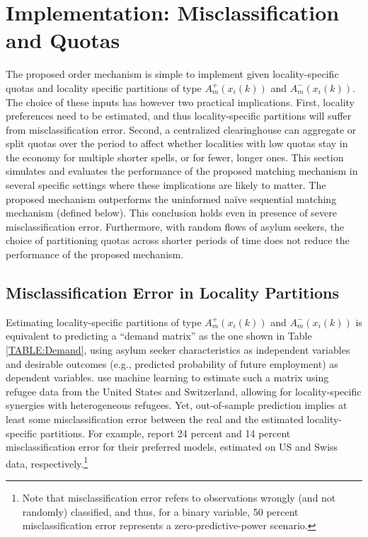 \documentclass[12pt,fleqn]{article}
\begin{document}
\section{Implementation: Misclassification and Quotas}\label{SEC:simulations}
The proposed order mechanism is simple to implement given locality-specific quotas and locality specific partitions of type $A^+_m(x_i(k))$ and $A^-_m(x_i(k))$. The choice of these inputs has however two practical implications. First, locality preferences need to be estimated, and thus locality-specific partitions will suffer from misclassification error. Second, a centralized clearinghouse can aggregate or split quotas over the period to affect whether localities with low quotas stay in the economy for multiple shorter spells, or for fewer, longer ones. This section simulates and evaluates the performance of the proposed matching mechanism in several specific settings where these implications are likely to matter. The proposed mechanism outperforms the uninformed na\"{i}ve sequential matching mechanism (defined below). This conclusion holds even in presence of severe misclassification error. Furthermore, with random flows of asylum seekers, the choice of partitioning quotas across shorter periods of time does not reduce the performance of the proposed mechanism.

\subsection{Misclassification Error in Locality Partitions}
Estimating locality-specific partitions of type $A^+_m(x_i(k))$ and $A^-_m(x_i(k))$ is equivalent to predicting a ``demand matrix'' as the one shown in Table \ref{TABLE:Demand}, using asylum seeker characteristics as independent variables and desirable outcomes (e.g., predicted probability of future employment) as dependent variables. \cite{bib:BansakEtAl} use machine learning to estimate such a matrix using refugee data from the United States and Switzerland, allowing for locality-specific synergies with heterogeneous refugees. Yet, out-of-sample prediction implies at least some misclassification error between the real and the estimated locality-specific partitions. For example, \cite{bib:BansakEtAl} report 24 percent and 14 percent misclassification error for their preferred models, estimated on US and Swiss data, respectively.\footnote{Note that misclassification error refers to observations wrongly (and not randomly) classified, and thus, for a binary variable, 50 percent misclassification error represents a zero-predictive-power scenario.}
\end{document}
